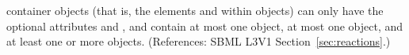 \ListOfSpeciesReferences container objects (that is, the elements
 and  within \Reaction
objects) can only have the optional attributes  and
, and contain at most one \Notes object, at most one
\Annotation object, and at least one or more \SpeciesReference objects.
(References: SBML L3V1 Section~\ref{sec:reactions}.)
